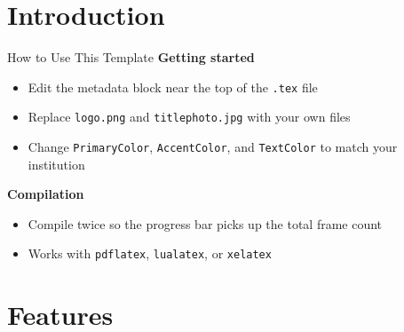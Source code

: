 \documentclass[aspectratio=169, 11pt]{beamer}
\begin{document}
{
  \begin{frame}
    \titlepage
  \end{frame}
}

\section{Introduction}

\begin{frame}{How to Use This Template}
  \textcolor{PrimaryColor}{\textbf{Getting started}} \\[6pt]
  \begin{itemize}
    \item Edit the metadata block near the top of the \texttt{.tex} file
    \item Replace \texttt{logo.png} and \texttt{titlephoto.jpg} with your own files
    \item Change \texttt{PrimaryColor}, \texttt{AccentColor}, and
          \texttt{TextColor} to match your institution
  \end{itemize}

  \vskip12pt
  \textcolor{PrimaryColor}{\textbf{Compilation}} \\[6pt]
  \begin{itemize}
    \item Compile twice so the progress bar picks up the total frame count
    \item Works with \texttt{pdflatex}, \texttt{lualatex}, or \texttt{xelatex}
  \end{itemize}
\end{frame}

\section{Features}
\end{document}

